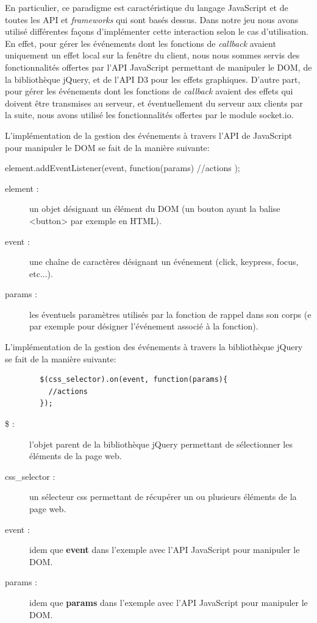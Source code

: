 \documentclass[12pt]{report}
\begin{document}
	En particulier, ce paradigme est caractéristique du langage JavaScript et de toutes les API et \textit{frameworks} qui sont basés dessus. Dans notre jeu nous avons utilisé différentes façons d'implémenter cette interaction selon le cas d'utilisation. En effet, pour gérer les événements dont les fonctions de \textit{callback} avaient uniquement un effet local sur la fenêtre du client, nous nous sommes servis des fonctionnalités offertes par l'API JavaScript permettant de manipuler le DOM, de la bibliothèque jQuery, et de l'API D3 pour les effets graphiques. D'autre part, pour gérer les événements dont les fonctions de \textit{callback} avaient des effets qui doivent être transmises au serveur, et éventuellement du serveur aux clients par la suite, nous avons utilisé les fonctionnalités offertes par le module socket.io.

	L'implémentation de la gestion des événements à travers l'API de JavaScript pour manipuler le DOM se fait de la manière suivante:

	\begin{verbatimtab}[4]
		element.addEventListener(event, function(params){
			//actions
		});
	\end{verbatimtab}

	\begin{description}
		\item[element :]{
			un objet désignant un élément du DOM
			(un bouton ayant la balise <button> par exemple en HTML).
		}
		\item[event :]{
			une chaîne de caractères désignant un événement
			(click, keypress, focus, etc...).
		}
		\item[params :]{
			les éventuels paramètres utilisés par la fonction de rappel dans son corps
			(e par exemple pour désigner l'événement associé à la fonction).
		}
	\end{description}

	L'implémentation de la gestion des événements à travers la bibliothèque jQuery se fait de la manière suivante:

	\begin{verbatim}
		$(css_selector).on(event, function(params){
		  //actions
		});
	\end{verbatim}

	\begin{description}
		\item[\$ :]{
			l'objet parent de la bibliothèque jQuery permettant de sélectionner les éléments de la page web.
		}
		\item[css\_selector :]{
			un sélecteur css permettant de récupérer un ou plusieurs éléments de la page web.
		}
		\item[event :]{
			idem que \textbf{event} dans l'exemple avec l'API JavaScript pour manipuler le DOM.
		}
		\item[params :]{
			idem que \textbf{params} dans l'exemple avec l'API JavaScript pour manipuler le DOM.
		}
	\end{description}
\end{document}
